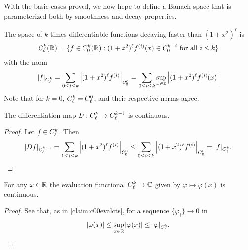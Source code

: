       With the basic cases proved, we now hope to define a Banach space that is parameterized both by smoothness and decay properties.
      \begin{defn}
        The space of $k$-times differentiable functions decaying faster than $(1+x^2)^\ell$ is
        \begin{align*}
          {C^k_\ell}(\mathbb{R}) = \{f\in {C^k_0}(\mathbb{R}):(1+x^2)^\ell f^{(i)}(x)\in C^{k-i}_0\text{ for all } i\le k\}
        \end{align*}
        with the norm
        \begin{align*}
          |f|_{C^k_\ell} = \sum_{0\le i\le k} \left|(1+x^2)^\ell f^{(i)}\right|_{C^0_0} = \sum_{0\le i\le k} \sup_{x\in\mathbb{R}} \left|(1+x^2)^\ell f^{(i)}(x)\right|
        \end{align*}
        Note that for $k=0$, ${C^k_\ell}={C^0_\ell}$, and their respective norms agree.
      \end{defn}

      \begin{claim}
        \label{claim:diffcontCkl}
        The differentiation map $D:{C^k_\ell}\rightarrow{C^{k-1}_\ell}$ is continuous.
        \begin{proof}
          Let $f\in{C^k_\ell}$.
          Then
          \begin{align*}
            |Df|_{C^{k-1}_\ell}
            = \sum_{1\le i\le k} \left| (1+x^2)^\ell f^{(i)} \right|_{C^0_0}
            \le \sum_{0\le i\le k} \left| (1+x^2)^\ell f^{(i)} \right|_{C^0_0}
            = |f|_{C^k_\ell}\text{.}
          \end{align*}
        \end{proof}
      \end{claim}

      \begin{claim}
        \label{claim:cklevalects}
        For any $x\in\mathbb{R}$ the evaluation functional ${C^k_\ell}\rightarrow\mathbb{C}$ given by $ \varphi\mapsto\varphi(x) $ is continuous.
        \begin{proof}
          See that, as in \cref{claim:c00evalcts}, for a sequence $\{\varphi_i\}\rightarrow0$ in \Ckl
          \begin{align*}
            |\varphi(x)| \le \sup_{x\in\mathbb{R}}|\varphi(x)| \le |\varphi|_{C^k_\ell}\text{.}
          \end{align*}
        \end{proof}
      \end{claim}


